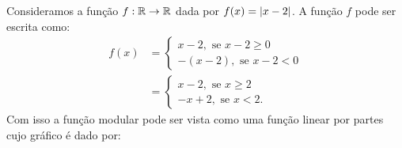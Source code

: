 \begin{exem}
  Consideramos a função $f: \mathbb{R} \rightarrow \mathbb{R}$ dada por $f(x)= \left|x-2\right|$. A função $f$ pode ser escrita como:
    \begin{align*}
        f(x)& = 
        \begin{cases}
         x -2, \text{ se } x-2 \geq 0 \\
         -(x - 2), \text{ se } x-2 < 0
        \end{cases} \\
        & = 
        \begin{cases}
         x -2, \text{ se } x \geq 2 \\
         -x +2, \text{ se } x < 2.
        \end{cases}
    \end{align*}
  Com isso a função modular pode ser vista como uma função linear por partes cujo gráfico é dado por:
  \begin{center}
\end{center}
\end{exem}

